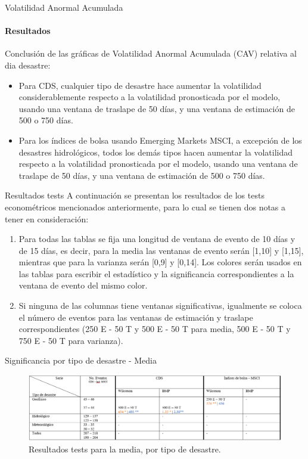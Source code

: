 \documentclass{beamer}
\begin{document}
\begin{frame}{Volatilidad Anormal Acumulada}
\framesubtitle{Resultados}
Conclusión de las gráficas de Volatilidad Anormal Acumulada (CAV) relativa al dia desastre:
\begin{itemize}
    \item Para CDS, cualquier tipo de desastre hace aumentar la volatilidad considerablemente respecto a la volatilidad pronosticada por el modelo, usando una ventana de traslape de 50 días, y una ventana de estimación de 500 o 750 días.
    \item Para los índices de bolsa usando Emerging Markets MSCI, a excepción de los desastres hidrológicos, todos los demás tipos hacen aumentar la volatilidad respecto a la volatilidad pronosticada por el modelo, usando una ventana de traslape de 50 días, y una ventana de estimación de 500 o 750 días.
\end{itemize}
\end{frame}

\begin{frame}{Resultados tests}
 A continuación se presentan los resultados de los tests econométricos mencionados anteriormente, para lo cual se tienen dos notas a tener en consideración:
 \begin{enumerate}
    \item Para todas las tablas se fija una longitud de ventana de evento de 10 días y de 15 días, es decir, para la media las ventanas de evento serán {\color{orangebracket} [1,10]} y {\color{bluecomma} [1,15]}, mientras que para la varianza serán {\color{orangebracket} [0,9]} y {\color{bluecomma} [0,14]}. Los colores serán usados en las tablas para escribir el estadístico y la significancia correspondientes a la ventana de evento del mismo color.
    \item Si ninguna de las columnas tiene ventanas significativas, igualmente se coloca el número de eventos para las ventanas de estimación y traslape correspondientes (250 E - 50 T y 500 E - 50 T para media, 500 E - 50 T y 750 E - 50 T para varianza).
 \end{enumerate}
\end{frame}

\begin{frame}{Significancia por tipo de desastre - Media}
    \begin{figure}
        \includegraphics[width=\linewidth]{../Graficos_Paper/Tablas/Media.png}
        \caption{Resultados tests para la media, por tipo de desastre.}
    \end{figure}
\end{frame}
\end{document}
